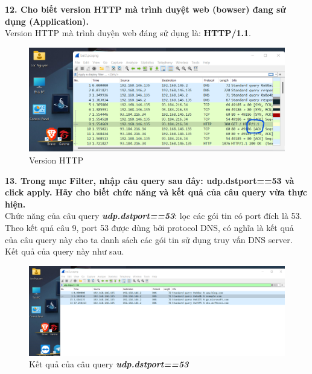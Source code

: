 \textbf{12. Cho biết version HTTP mà trình duyệt web (bowser) đang sử dụng (Application).}\\
Version HTTP mà trình duyện web đáng sử dụng là: \textbf{HTTP/1.1}.
\begin{figure}[H]
\begin{center}
\includegraphics[scale=1]{../figures/p2/p2_httpversion}
\end{center}
\caption{Version HTTP}
\end{figure}

\textbf{13.	 Trong mục Filter, nhập câu query sau đây: udp.dstport==53 và click apply. Hãy cho biết chức năng và kết quả của câu query vừa thực hiện.}\\
Chức năng của câu query \textbf{\textit{udp.dstport==53}}: lọc các gói tin có port đích là 53. Theo kết quả câu 9, port 53 được dùng bởi protocol DNS, có nghĩa là kết quả của câu query này cho ta danh sách các gói tin sử dụng truy vấn DNS server.\\
Kết quả của query này như sau.
\begin{figure}[H]
\begin{center}
\includegraphics[scale=.45]{../figures/p2/p2_query}
\end{center}
\caption{Kết quả của câu query \textbf{\textit{udp.dstport==53}}}
\end{figure}

